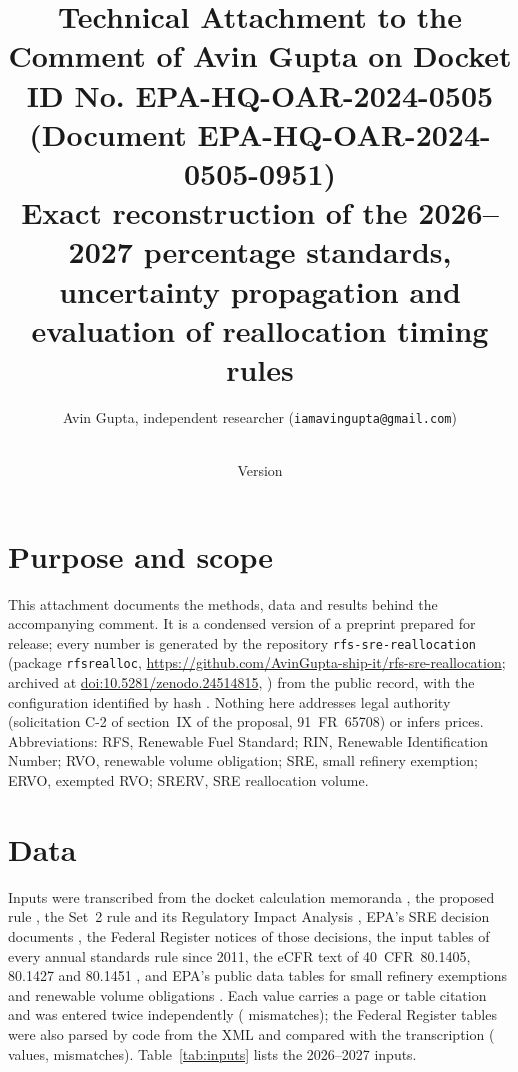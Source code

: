 \documentclass[11pt]{article}
\title{Technical Attachment to the Comment of Avin Gupta on Docket ID No. EPA-HQ-OAR-2024-0505 (Document EPA-HQ-OAR-2024-0505-0951)\\[0.5em]\large Exact reconstruction of the 2026--2027 percentage standards, uncertainty propagation and evaluation of reallocation timing rules}
\author{Avin Gupta, independent researcher (\texttt{iamavingupta@gmail.com})}
\date{\commentdate\\[0.3em]\normalsize Version \releaseversion}
\begin{document}
\maketitle

\section{Purpose and scope}
This attachment documents the methods, data and results behind the accompanying comment. It is a condensed version of a preprint prepared for release; every number is generated by the repository \texttt{rfs-sre-reallocation} (package \texttt{rfsrealloc}, \url{https://github.com/AvinGupta-ship-it/rfs-sre-reallocation}; archived at \href{https://doi.org/10.5281/zenodo.24514815}{doi:10.5281/zenodo.24514815}, \citealp{gupta2026repository}) from the public record, with the configuration identified by hash \valconfigHash{}. Nothing here addresses legal authority (solicitation C-2 of section~IX of the proposal, 91~FR~65708) or infers prices. Abbreviations: RFS, Renewable Fuel Standard; RIN, Renewable Identification Number; RVO, renewable volume obligation; SRE, small refinery exemption; ERVO, exempted RVO; SRERV, SRE reallocation volume.

\section{Data}
Inputs were transcribed from the docket calculation memoranda \citep{docket_0789,docket_0790,docket_0956}, the proposed rule \citep{fr_2026_21155}, the Set~2 rule \citep{fr_2026_06275} and its Regulatory Impact Analysis \citep{ria_420r26011}, EPA's SRE decision documents \citep{epa_420r25010,epa_420r25013,epa_420r26004,epa_420r26017}, the Federal Register notices of those decisions, the input tables of every annual standards rule since 2011, the eCFR text of 40~CFR~80.1405, 80.1427 and 80.1451 \citep{ecfr_80_1405,ecfr_80_1427,ecfr_80_1451}, and EPA's public data tables for small refinery exemptions and renewable volume obligations \citep{epa_sre_dashboard,epa_rvo_dashboard}. Each value carries a page or table citation and was entered twice independently (\valnDoubleEntryMismatches{} mismatches); the Federal Register tables were also parsed by code from the XML and compared with the transcription (\valnFrParsedValuesCompared{} values, \valnFrParsedValuesMismatched{} mismatches). Table~\ref{tab:inputs} lists the 2026--2027 inputs.


\end{document}
